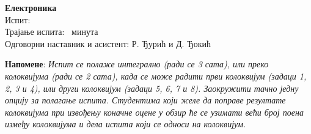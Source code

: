 \documentclass[10pt, a4paper, twoside]{article}
\begin{document}
\noindent
\begin{minipage}[t]{0.5\textwidth}
\begin{flushleft}
\vspace*{0pt}
{\large \textbf{Електроника}} \\[2mm]
Испит: \datumIspita \\
Трајање испита: \trajanjeIspita\ минута \\
Одговорни наставник и асистент: Р. Ђурић и Д. Ђокић
\end{flushleft}
\end{minipage}
\hfill
\begin{minipage}[t]{0.5\textwidth}
\vspace*{0pt}
\end{minipage}

\vspace*{2.5mm}

\noindent
\textbf{Напомене}: 
\textit{Испит се полаже интегрално (ради се 3 сата), или преко колоквијума (ради се 2 сата), када се може радити први
колоквијум (задаци 1, 2, 3 и 4), или други колоквијум (задаци 5, 6, 7 и 8). 
Заокружити тачно једну опцију за полагање испита.
Студентима који желе да поправе резултате колоквијума 
при извођењу коначне оцене
у обзир ће се узимати већи број поена између колоквијума 
и дела испита који се односи на
колоквијум. 
} \vspace*{2mm}
\end{document}
